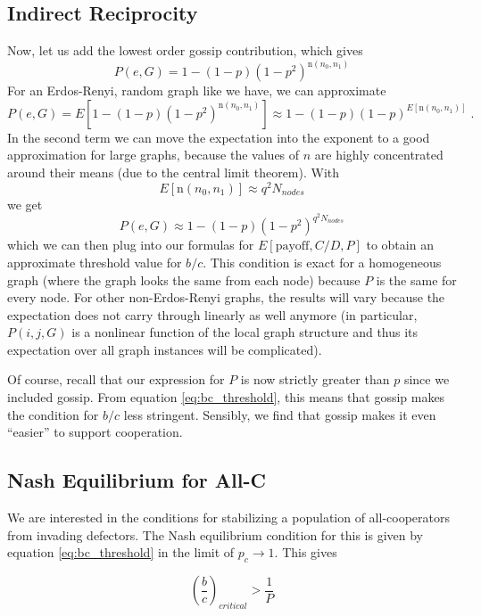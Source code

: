 \documentclass{article}
\renewcommand{\=}[1]{\stackrel{#1}{=}} %
\begin{document}
\subsection{Indirect Reciprocity}
Now, let us add the lowest order gossip contribution, which gives
\[P(e,G) = 1 - (1-p)(1-p^2)^{\text{n}(n_0,n_1)}\]
For an Erdos-Renyi, random graph like we have, we can approximate
\[P(e,G) = E[1 - (1-p)(1-p^2)^{\text{n}(n_0,n_1)}] \approx 1 - (1-p)(1-p)^{E[\text{n}(n_0,n_1)]}\;.\]
In the second term we can move the expectation into the exponent to a good approximation for large graphs, because the values of $n$ are highly concentrated around their means (due to the central limit theorem). With
\[E[\text{n}(n_0,n_1)] \approx q^2N_{nodes}\]
we get
\begin{equation}\label{eq:P_first_order}
P(e,G) \approx 1 - (1-p)(1-p^2)^{q^2N_{nodes}}
\end{equation}
which we can then plug into our formulas for $E[\text{payoff},C/D,P]$ to obtain an approximate threshold value for $b/c$. This condition is exact for
a homogeneous graph (where the graph looks the same from each node) because $P$ is the same for every node. For other non-Erdos-Renyi
graphs, the results will vary because the expectation does not carry
through linearly as well anymore (in particular, $P(i,j,G)$ is a
nonlinear function of the local graph structure and thus its expectation
over all graph instances will be complicated).

Of course, recall that our expression for $P$ is now strictly greater than $p$ since we included gossip. From equation \ref{eq:bc_threshold}, this means that gossip makes the condition for $b/c$ less stringent. Sensibly, we find that gossip makes it even ``easier'' to support cooperation. 


\subsection{Nash Equilibrium for All-C}
We are interested in the conditions for stabilizing a population of all-cooperators from invading defectors. The Nash equilibrium condition for this is given by equation \ref{eq:bc_threshold} in the limit of $p_c \to 1$. This gives

\begin{equation}\label{eq:bc_threshold}
\left(\frac{b}{c}\right)_{critical} > \frac{1}{P}
\end{equation}
\end{document}
